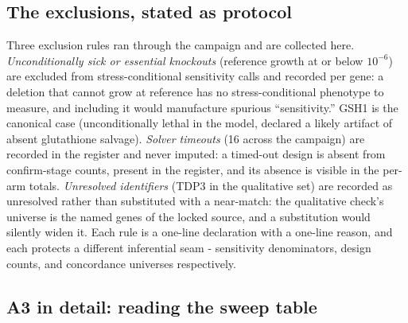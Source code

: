 \documentclass[12pt]{article}
\begin{document}
\subsection{The exclusions, stated as protocol}

Three exclusion rules ran through the campaign and are collected
here. \emph{Unconditionally sick or essential knockouts} (reference
growth at or below $10^{-6}$) are excluded from stress-conditional
sensitivity calls and recorded per gene: a deletion that cannot grow
at reference has no stress-conditional phenotype to measure, and
including it would manufacture spurious ``sensitivity.'' GSH1 is the
canonical case (unconditionally lethal in the model, declared a
likely artifact of absent glutathione salvage). \emph{Solver
timeouts} (16 across the campaign) are recorded in the register and
never imputed: a timed-out design is absent from confirm-stage
counts, present in the register, and its absence is visible in the
per-arm totals. \emph{Unresolved identifiers} (TDP3 in the
qualitative set) are recorded as unresolved rather than substituted
with a near-match: the qualitative check's universe is the named
genes of the locked source, and a substitution would silently widen
it. Each rule is a one-line declaration with a one-line reason, and
each protects a different inferential seam - sensitivity
denominators, design counts, and concordance universes
respectively.

\subsection{A3 in detail: reading the sweep table}
\end{document}
